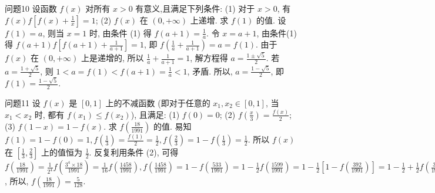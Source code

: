 问题10 设函数 $f(x)$ 对所有 $x>0$ 有意义,且满足下列条件:
(1) 对于 $x>0$, 有 $f(x) f\left[f(x)+\frac{1}{x}\right]=1$;
(2) $f(x)$ 在 $(0,+\infty)$ 上递增.
求 $f(1)$ 的值.
设 $f(1)=a$, 则当 $x=1$ 时, 由条件 (1) 得 $f(a+1)=\frac{1}{a}$. 令 $x= a+1$, 由条件(1) 得 $f(a+1) f\left[f(a+1)+\frac{1}{a+1}\right]=1$, 即 $f\left(\frac{1}{a}+\frac{1}{a+1}\right)= a=f(1)$. 由于 $f(x)$ 在 $(0,+\infty)$ 上是递增的, 所以 $\frac{1}{a}+\frac{1}{a+1}=1$, 解方程得 $a=\frac{1 \pm \sqrt{5}}{2}$. 若 $a=\frac{1+\sqrt{5}}{2}$, 则 $1<a=f(1)<f(a+1)=\frac{1}{a}<1$, 矛盾.
所以, $a=\frac{1-\sqrt{5}}{2}$, 即 $f(1)=\frac{1-\sqrt{5}}{2}$.



问题11 设 $f(x)$ 是 $[0,1]$ 上的不减函数 (即对于任意的 $x_1, x_2 \in[0,1]$, 当 $x_1< x_2$ 时, 都有 $f\left(x_1\right) \leqslant f\left(x_2\right)$), 且满足:
(1) $f(0)=0$;
(2) $f\left(\frac{x}{3}\right)=\frac{f(x)}{2}$;
(3) $f(1-x)=1-f(x)$.
求 $f\left(\frac{18}{1991}\right)$ 的值.
易知 $f(1)=1-f(0)=1, f\left(\frac{1}{3}\right)=\frac{f(1)}{2}=\frac{1}{2}, f\left(\frac{2}{3}\right)=1- f\left(\frac{1}{3}\right)=\frac{1}{2}$. 所以 $f(x)$ 在 $\left[\frac{1}{3}, \frac{2}{3}\right]$ 上的值恒为 $\frac{1}{2}$. 反复利用条件 (2), 可得
$f\left(\frac{18}{1991}\right)=\frac{1}{2^4} f\left(\frac{3^4 \times 18}{1991}\right)=\frac{1}{16} f\left(\frac{1458}{1991}\right), f\left(\frac{1458}{1991}\right)=1-f\left(\frac{533}{1991}\right)=1- \frac{1}{2} f\left(\frac{1599}{1991}\right)=1-\frac{1}{2}\left[1-f\left(\frac{392}{1991}\right)\right]=1-\frac{1}{2}+\frac{1}{2} f\left(\frac{392}{1991}\right)=\frac{1}{2}+ \frac{1}{4} f\left(\frac{1176}{1991}\right)=\frac{1}{2}+\frac{1}{8}$, 所以, $f\left(\frac{18}{1991}\right)=\frac{5}{128}$.



